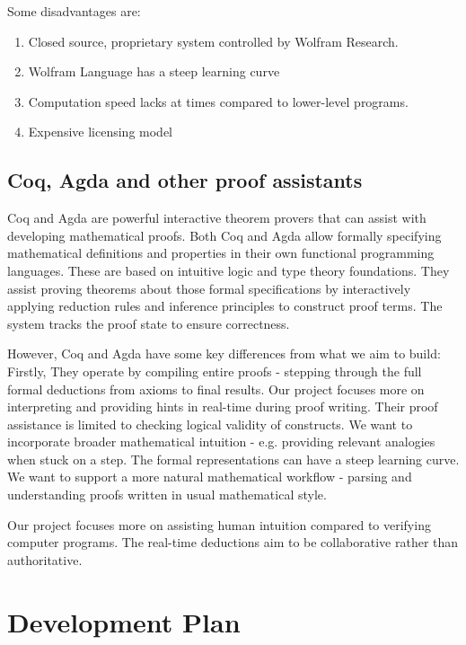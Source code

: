\documentclass[9pt,a4paper,twocolumn]{article}
\newcounter{theo}
\newcounter{def}
\begin{document}
            Some disadvantages are:

            \begin{enumerate}
                \item Closed source, proprietary system controlled by Wolfram Research.
                \item Wolfram Language has a steep learning curve
                \item  Computation speed lacks at times compared to lower-level programs.
                \item Expensive licensing model
            \end{enumerate}
        \subsection{Coq, Agda and other proof assistants}
            Coq and Agda are powerful interactive theorem provers that can assist with developing mathematical proofs. Both Coq and Agda allow formally specifying mathematical definitions and properties in their own functional programming languages. These are based on intuitive logic and type theory foundations. They assist proving theorems about those formal specifications by interactively applying reduction rules and inference principles to construct proof terms. The system tracks the proof state to ensure correctness.        
            
            However, Coq and Agda have some key differences from what we aim to build:
            Firstly, They operate by compiling entire proofs - stepping through the full formal deductions from axioms to final results. Our project focuses more on interpreting and providing hints in real-time during proof writing. Their proof assistance is limited to checking logical validity of constructs. We want to incorporate broader mathematical intuition - e.g. providing relevant analogies when stuck on a step. The formal representations can have a steep learning curve. We want to support a more natural mathematical workflow - parsing and understanding proofs written in usual mathematical style.
            
            Our project focuses more on assisting human intuition compared to verifying computer programs. The real-time deductions aim to be collaborative rather than authoritative.  


             
        \section{Development Plan}
\end{document}
